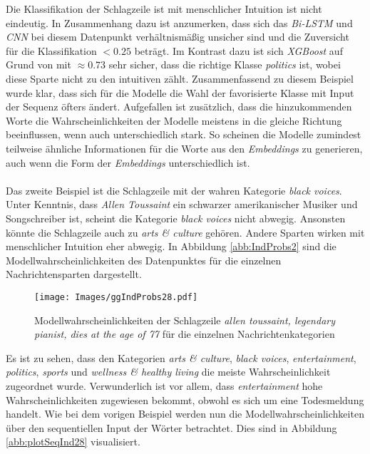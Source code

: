 \documentclass[a4paper,11pt]{article}
\begin{document}
Die Klassifikation der Schlagzeile ist mit menschlicher Intuition ist nicht eindeutig. In Zusammenhang dazu ist anzumerken, dass sich das \textit{Bi-LSTM} und \textit{CNN} bei diesem Datenpunkt verhältnismäßig unsicher sind und die Zuversicht für die Klassifikation $<  0.25$ beträgt. Im Kontrast dazu ist sich \textit{XGBoost} auf Grund von  mit $\approx 0.73$ sehr sicher, dass die richtige Klasse \textit{politics} ist, wobei diese Sparte nicht zu den intuitiven zählt. Zusammenfassend zu diesem Beispiel wurde klar, dass sich für die Modelle die Wahl der favorisierte Klasse mit Input der Sequenz öfters ändert. Aufgefallen ist zusätzlich, dass die hinzukommenden Worte die Wahrscheinlichkeiten der Modelle meistens in die gleiche Richtung beeinflussen, wenn auch unterschiedlich stark. So scheinen die Modelle zumindest teilweise ähnliche Informationen für die Worte aus den \textit{Embeddings} zu generieren, auch wenn die Form der \textit{Embeddings} unterschiedlich ist.\\
\\
Das zweite Beispiel ist die Schlagzeile  mit der wahren Kategorie \textit{black voices}. Unter Kenntnis, dass \textit{Allen Toussaint} ein schwarzer amerikanischer Musiker und Songschreiber ist, scheint die Kategorie \textit{black voices} nicht abwegig. Ansonsten könnte die Schlagzeile auch zu \textit{arts \& culture} gehören. Andere Sparten wirken mit menschlicher Intuition eher abwegig. In Abbildung \ref{abb:IndProbs2} sind die Modellwahrscheinlichkeiten des Datenpunktes für die einzelnen Nachrichtensparten dargestellt.

\begin{figure}[ht]
    \centering
\texttt{[image: Images/ggIndProbs28.pdf]} 
\caption{Modellwahrscheinlichkeiten der Schlagzeile \textit{allen toussaint, legendary pianist, dies at the age of 77} für die einzelnen Nachrichtenkategorien}
\label{abb:IndProbs28}
\end{figure}

Es ist zu sehen, dass den Kategorien \textit{arts \& culture}, \textit{black voices}, \textit{entertainment}, \textit{politics}, \textit{sports} und \textit{wellness \& healthy living} die meiste Wahrscheinlichkeit zugeordnet wurde. Verwunderlich ist vor allem, dass \textit{entertainment} hohe Wahrscheinlichkeiten zugewiesen bekommt, obwohl es sich um eine Todesmeldung handelt. Wie bei dem vorigen Beispiel werden nun die Modellwahrscheinlichkeiten über den sequentiellen Input der Wörter betrachtet. Dies sind in Abbildung \ref{abb:plotSeqInd28} visualisiert.
\end{document}
